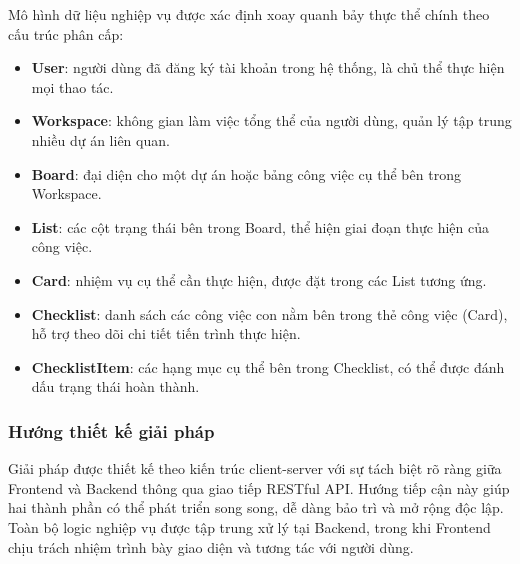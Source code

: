 Mô hình dữ liệu nghiệp vụ được xác định xoay quanh bảy thực thể chính theo cấu trúc phân cấp:
\begin{itemize}
    \item \textbf{User}: người dùng đã đăng ký tài khoản trong hệ thống, là chủ thể thực hiện mọi thao tác.
    \item \textbf{Workspace}: không gian làm việc tổng thể của người dùng, quản lý tập trung nhiều dự án liên quan.
    \item \textbf{Board}: đại diện cho một dự án hoặc bảng công việc cụ thể bên trong Workspace.
    \item \textbf{List}: các cột trạng thái bên trong Board, thể hiện giai đoạn thực hiện của công việc.
    \item \textbf{Card}: nhiệm vụ cụ thể cần thực hiện, được đặt trong các List tương ứng.
    \item \textbf{Checklist}: danh sách các công việc con nằm bên trong thẻ công việc (Card), hỗ trợ theo dõi chi tiết tiến trình thực hiện.
    \item \textbf{ChecklistItem}: các hạng mục cụ thể bên trong Checklist, có thể được đánh dấu trạng thái hoàn thành.
\end{itemize}

\subsubsection{Hướng thiết kế giải pháp}
Giải pháp được thiết kế theo kiến trúc client-server với sự tách biệt rõ ràng giữa Frontend và Backend thông qua giao tiếp RESTful API. Hướng tiếp cận này giúp hai thành phần có thể phát triển song song, dễ dàng bảo trì và mở rộng độc lập. Toàn bộ logic nghiệp vụ được tập trung xử lý tại Backend, trong khi Frontend chịu trách nhiệm trình bày giao diện và tương tác với người dùng.

